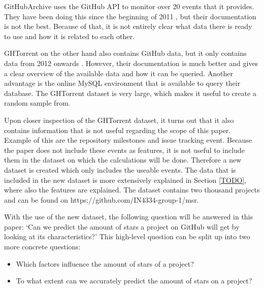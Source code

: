     GitHubArchive uses the GitHub API to monitor over 20 events \cite{TODO} that it provides. 
    They have been doing this since the beginning of 2011 \cite{TODO}, but their documentation is not the best.
    Because of that, it is not entirely clear what data there is ready to use and how it is related to each other.
    
    GHTorrent on the other hand also contains GitHub data, but it only contains data from 2012 onwards \cite{TODO}.
    However, their documentation is much better and gives a clear overview of the available data and how it can be queried.
    Another advantage is the online MySQL environment \cite{TODO} that is available to query their database.
    The GHTorrent dataset is very large, which makes it useful to create a random sample from.



    Upon closer inspection of the GHTorrent dataset, it turns out that it also contains information that is not useful regarding the scope of this paper. 
    Example of this are the repository milestones and issue tracking event.
    Because the paper does not include these events as features, it is not useful to include them in the dataset on which the calculations will be done. 
    Therefore a new dataset is created which only includes the useable events. 
    The data that is included in the new dataset is more extensively explained in Section \ref{TODO}, where also the features are explained.
    The dataset contains two thousand projects and can be found on  https://github.com/IN4334-group-1/msr.

    With the use of the new dataset, the following question will be answered in this paper: `Can we predict the amount of stars a project on GitHub will get by looking at its characteristics?'
    This high-level question can be split up into two more concrete questions:
    \begin{itemize}
        \item Which factors influence the amount of stars of a project?
        \item To what extent can we accurately predict the amount of stars on a project?
    \end{itemize}




